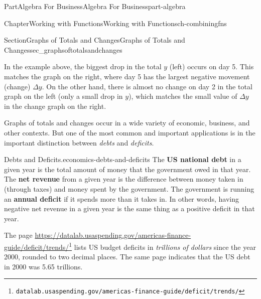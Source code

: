 \documentclass[oneside,10pt,]{tufte-book}
\newcommand{\terminology}[1]{\textbf{#1}}
\numberwithin{equation}{chapter}
\def \tikzhistogram (#1,#2){\draw[fill=blue,opacity=0.3] ({#1+((\xtwo-\xmin)/5)},#2) rectangle ({#1-((\xtwo-\xmin)/5)},0); \draw[draw,thick] ({#1+((\xtwo-\xmin)/5)},#2) rectangle ({#1-((\xtwo-\xmin)/5)},0); \node[draw,fill=blue, circle,inner sep=2.5pt] at (#1,#2) {};}
\begin{document}
\begin{partptx}{Part}{Algebra For Business}{}{Algebra For Business}{}{}{part-algebra}
\begin{chapterptx}{Chapter}{Working with Functions}{}{Working with Functions}{}{}{ch-combiningfns}
\begin{sectionptx}{Section}{\textasteriskcentered{}Graphs of Totals and Changes}{}{\textasteriskcentered{}Graphs of Totals and Changes}{}{}{sec_graphsoftotalsandchanges}
\begin{image}{0}{1}{0}{}
{
}%
\end{image}%
In the example above, the biggest drop in the total \(y\) (left) occurs on day 5.  This matches the graph on the right, where day 5 has the largest negative movement (change) \(\Delta y\). On the other hand, there is almost no change on day 2 in the total graph on the left (only a small drop in \(y\)), which matches the small value of \(\Delta y\) in the change graph on the right.%
\par
Graphs of totals and changes occur in a wide variety of economic, business, and other contexts. But one of the most common and important applications is in the important distinction between \emph{debts} and \emph{deficits}.%
\begin{paragraphs}{Debts and Deficits.}{economics-debts-and-deficits}%
The \terminology{US national debt} in a given year is the total amount of money that the government owed in that year. The \terminology{net revenue} from a given year is the difference between money taken in (through taxes) and money spent by the government. The government is running an \terminology{annual deficit} if it spends more than it takes in. In other words, having negative net revenue in a given year is the same thing as a positive deficit in that year.%
\par
The page \href{https://datalab.usaspending.gov/americas-finance-guide/deficit/trends/}{https:\slash{}\slash{}datalab.usaspending.gov\slash{}americas-finance-guide\slash{}deficit\slash{}trends\slash{}}\footnote{\nolinkurl{datalab.usaspending.gov/americas-finance-guide/deficit/trends/}\label{economics-debts-and-deficits-3-2}} lists US budget deficits in \emph{trillions of dollars} since the year 2000, rounded to two decimal places. The same page indicates that the US debt in 2000 was 5.65 trillions.%
\par

\end{paragraphs}
\end{sectionptx}
\end{chapterptx}
\end{partptx}
\end{document}
